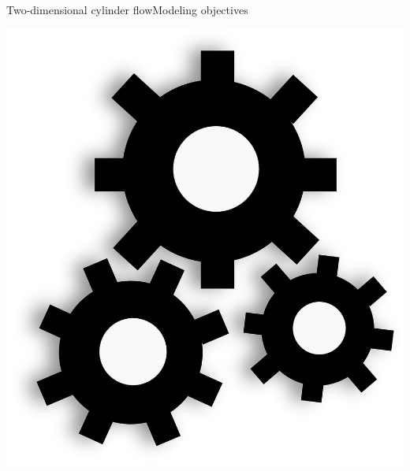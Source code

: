 \documentclass[usenames,dvipsnames,svgnames,10pt,aspectratio=169]{beamer}
\begin{document}
\begin{frame}[t, c]{Two-dimensional cylinder flow}{Modeling objectives}
\begin{minipage}{.68\textwidth}
  \end{minipage}%
  \hfill
  \begin{minipage}{.28\textwidth}
    \centering
    \includegraphics[width=\textwidth]{Gears}
  \end{minipage}

  \vspace{1cm}
\end{frame}
\end{document}
